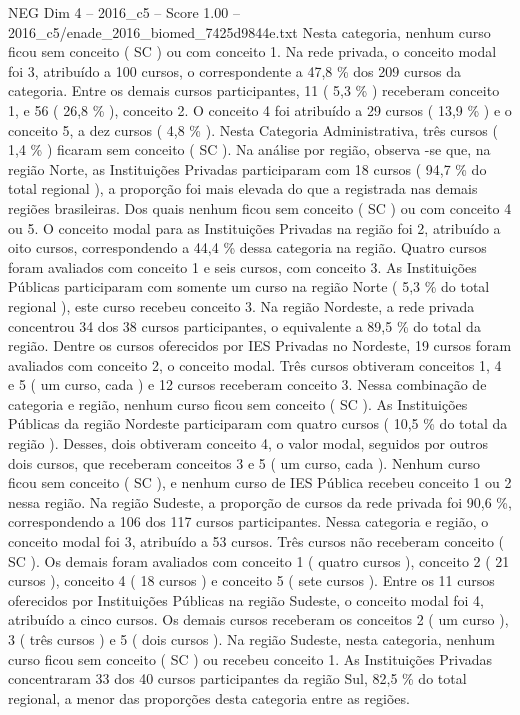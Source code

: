 \begin{textsample}{NEG Dim 4 – 2016\_c5 – Score 1.00 – 2016\_c5/enade\_2016\_biomed\_7425d9844e.txt}
Nesta categoria, nenhum curso ficou sem conceito ( SC ) ou com conceito 1.
Na rede privada, o conceito modal foi 3, atribuído a 100 cursos, o correspondente a 47,8 \% dos 209 cursos da categoria.
Entre os demais cursos participantes, 11 ( 5,3 \% ) receberam conceito 1, e 56 ( 26,8 \% ), conceito 2.
O conceito 4 foi atribuído a 29 cursos ( 13,9 \% ) e o conceito 5, a dez cursos ( 4,8 \% ).
Nesta Categoria Administrativa, três cursos ( 1,4 \% ) ficaram sem conceito ( SC ).
Na análise por região, observa -se que, na região Norte, as Instituições Privadas participaram com 18 cursos ( 94,7 \% do total regional ), a proporção foi mais elevada do que a registrada nas demais regiões brasileiras.
Dos quais nenhum ficou sem conceito ( SC ) ou com conceito 4 ou 5.
O conceito modal para as Instituições Privadas na região foi 2, atribuído a oito cursos, correspondendo a 44,4 \% dessa categoria na região.
Quatro cursos foram avaliados com conceito 1 e seis cursos, com conceito 3.
As Instituições Públicas participaram com somente um curso na região Norte ( 5,3 \% do total regional ), este curso recebeu conceito 3.
Na região Nordeste, a rede privada concentrou 34 dos 38 cursos participantes, o equivalente a 89,5 \% do total da região.
Dentre os cursos oferecidos por IES Privadas no Nordeste, 19 cursos foram avaliados com conceito 2, o conceito modal.
Três cursos obtiveram conceitos 1, 4 e 5 ( um curso, cada ) e 12 cursos receberam conceito 3.
Nessa combinação de categoria e região, nenhum curso ficou sem conceito ( SC ).
As Instituições Públicas da região Nordeste participaram com quatro cursos ( 10,5 \% do total da região ).
Desses, dois obtiveram conceito 4, o valor modal, seguidos por outros dois cursos, que receberam conceitos 3 e 5 ( um curso, cada ).
Nenhum curso ficou sem conceito ( SC ), e nenhum curso de IES Pública recebeu conceito 1 ou 2 nessa região.
Na região Sudeste, a proporção de cursos da rede privada foi 90,6 \%, correspondendo a 106 dos 117 cursos participantes.
Nessa categoria e região, o conceito modal foi 3, atribuído a 53 cursos.
Três cursos não receberam conceito ( SC ).
Os demais foram avaliados com conceito 1 ( quatro cursos ), conceito 2 ( 21 cursos ), conceito 4 ( 18 cursos ) e conceito 5 ( sete cursos ).
Entre os 11 cursos oferecidos por Instituições Públicas na região Sudeste, o conceito modal foi 4, atribuído a cinco cursos.
Os demais cursos receberam os conceitos 2 ( um curso ), 3 ( três cursos ) e 5 ( dois cursos ).
Na região Sudeste, nesta categoria, nenhum curso ficou sem conceito ( SC ) ou recebeu conceito 1.
As Instituições Privadas concentraram 33 dos 40 cursos participantes da região Sul, 82,5 \% do total regional, a menor das proporções desta categoria entre as regiões.

\end{textsample}
